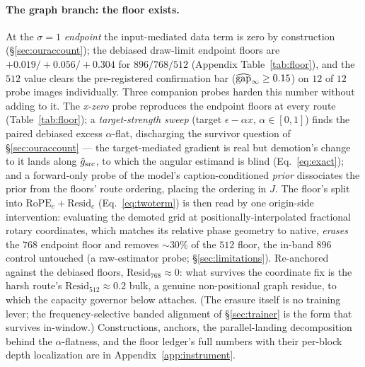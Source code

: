 \paragraph{The graph branch: the floor exists.}
At the $\sigma = 1$ \emph{endpoint} the input-mediated data term is
zero by construction (\S\ref{sec:ouraccount}); the debiased
draw-limit endpoint floors are
$+0.019 / +0.056 / +0.304$ for $896/768/512$ (Appendix
Table~\ref{tab:floor}),
and the $512$ value clears the pre-registered confirmation bar
($\widehat{\mathrm{gap}}_\infty \ge 0.15$) on $12$ of $12$ probe images individually.
Three companion probes harden this number without adding to it. The
\emph{x-zero} probe reproduces the endpoint floors at every route
(Table~\ref{tab:floor}); a \emph{target-strength sweep} (target
$\epsilon - \alpha x$, $\alpha \in [0, 1]$) finds the paired debiased
excess $\alpha$-flat, discharging the survivor question of
\S\ref{sec:ouraccount} --- the target-mediated gradient is real but
demotion's change to it lands along $\hat g_{\mathrm{src}}$, to which the
angular estimand is blind (Eq.~\ref{eq:exact}); and a forward-only
probe of the model's caption-conditioned \emph{prior} dissociates the
prior from the floors' route ordering, placing the ordering in $J$.
The floor's split into $\mathrm{RoPE}_e + \mathrm{Resid}_e$
(Eq.~\ref{eq:twoterm}) is then read by one origin-side intervention:
evaluating the demoted grid at positionally-interpolated fractional
rotary coordinates, which matches its relative phase geometry to
native, \emph{erases} the $768$ endpoint floor and removes
${\sim}30\%$ of the $512$ floor, the in-band $896$ control untouched
(a raw-estimator probe; \S\ref{sec:limitations}). Re-anchored against
the debiased floors, $\mathrm{Resid}_{768} \approx 0$: what survives
the coordinate fix is the harsh route's
$\mathrm{Resid}_{512} \approx 0.2$ bulk, a genuine non-positional
graph residue, to which the capacity governor below attaches. (The
erasure itself is no training lever; the frequency-selective banded
alignment of \S\ref{sec:trainer} is the form that survives
in-window.) Constructions, anchors, the parallel-landing
decomposition behind the $\alpha$-flatness, and the floor ledger's
full numbers with their per-block depth localization are in
Appendix~\ref{app:instrument}.

